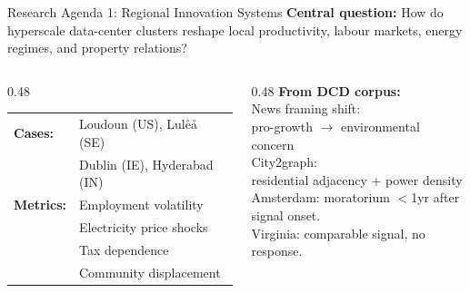 \documentclass[aspectratio=169,12pt]{beamer}
\begin{document}
\begin{frame}{Research Agenda 1: Regional Innovation Systems}
\small\textbf{Central question:} How do hyperscale data-center clusters reshape
local productivity, labour markets, energy regimes, and property relations?\\[0.5em]
\begin{columns}[T]
\begin{column}{0.48\textwidth}
  \footnotesize
  \begin{tabular}{@{}ll@{}}
    \textbf{Cases:}    & Loudoun (US), Lul\r{e}å (SE) \\
                       & Dublin (IE), Hyderabad (IN) \\[0.3em]
    \textbf{Metrics:}  & Employment volatility \\
                       & Electricity price shocks \\
                       & Tax dependence \\
                       & Community displacement \\
  \end{tabular}
\end{column}
\begin{column}{0.48\textwidth}
  \footnotesize
  \textbf{From DCD corpus:}\\[0.3em]
  News framing shift:\\
  pro-growth $\to$ environmental concern\\[0.3em]
  City2graph:\\
  residential adjacency + power density\\[0.3em]
  \alert{Amsterdam: moratorium $<$1yr after\\
  signal onset.\\
  Virginia: comparable signal, no response.}
\end{column}
\end{columns}
\end{frame}
\end{document}
